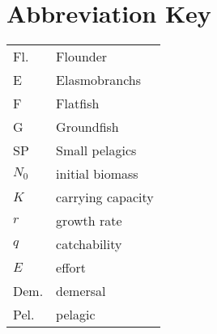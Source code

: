 \section{Abbreviation Key}

\begin{tabular}{l l}
Fl. & Flounder \\
E & Elasmobranchs \\
F & Flatfish \\
G & Groundfish \\
SP & Small pelagics \\
$N_0$ &initial biomass \\
$K$ & carrying capacity \\
$r$ & growth rate \\
$q$ & catchability \\
$E$ & effort \\
Dem. & demersal \\
Pel. & pelagic \\
\end{tabular}